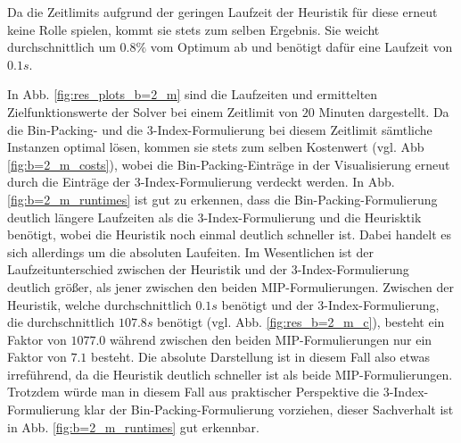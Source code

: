 Da die Zeitlimits aufgrund der geringen Laufzeit der Heuristik für diese erneut keine Rolle spielen,
kommt sie stets zum selben Ergebnis. Sie weicht durchschnittlich um $0.8 \%$ vom
Optimum ab und benötigt dafür eine Laufzeit von $0.1s$.

\pagebreak

In Abb. \ref{fig:res_plots_b=2_m} sind die Laufzeiten und ermittelten Zielfunktionswerte der Solver bei einem Zeitlimit von $20$
Minuten dargestellt. Da die Bin-Packing- und die 3-Index-Formulierung bei diesem Zeitlimit sämtliche Instanzen optimal lösen,
kommen sie stets zum selben Kostenwert (vgl. Abb \ref{fig:b=2_m_costs}),
wobei die Bin-Packing-Einträge in der Visualisierung erneut durch die Einträge der 3-Index-Formulierung verdeckt werden.
In Abb. \ref{fig:b=2_m_runtimes} ist gut zu erkennen, dass die Bin-Packing-Formulierung deutlich längere Laufzeiten als die 3-Index-Formulierung
und die Heurisktik benötigt, wobei die Heuristik noch einmal deutlich schneller ist. Dabei handelt es sich allerdings um die absoluten Laufeiten.
Im Wesentlichen ist der Laufzeitunterschied zwischen der Heuristik und der 3-Index-Formulierung deutlich größer, als jener zwischen den beiden
MIP-Formulierungen. Zwischen der Heuristik, welche durchschnittlich $0.1s$ benötigt und der 3-Index-Formulierung, die durchschnittlich $107.8s$ benötigt (vgl. Abb. \ref{fig:res_b=2_m_c}), besteht ein Faktor von $1077.0$ während zwischen den beiden MIP-Formulierungen nur ein Faktor von
$7.1$ besteht. Die absolute Darstellung ist in diesem Fall also etwas irreführend, da die Heuristik deutlich schneller ist als beide MIP-Formulierungen. Trotzdem würde man in diesem Fall aus praktischer Perspektive die 3-Index-Formulierung klar der Bin-Packing-Formulierung vorziehen, dieser Sachverhalt ist in Abb. \ref{fig:b=2_m_runtimes} gut erkennbar.

